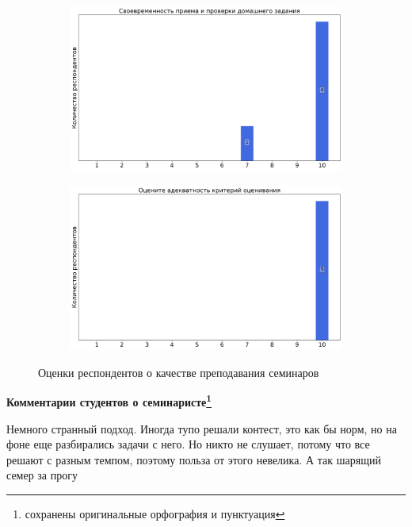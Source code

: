 \begin{figure}[H]
\begin{subfigure}[b]{0.45\textwidth}
                \includegraphics[width=\textwidth]{images/1 course/Информатика/seminarists-marks-Подлесных Д.А.-2.png}
            \end{subfigure}
            \begin{subfigure}[b]{0.45\textwidth}
                \centering
                \includegraphics[width=\textwidth]{images/1 course/Информатика/seminarists-marks-Подлесных Д.А.-3.png}
            \end{subfigure}	
            \caption{Оценки респондентов о качестве преподавания семинаров}
        \end{figure}

        \textbf{Комментарии студентов о семинаристе\protect\footnote{сохранены оригинальные орфография и пунктуация}}
            \begin{commentbox} 
                Немного странный подход. Иногда тупо решали контест, это как бы норм, но на фоне еще разбирались задачи с него. Но никто не слушает, потому что все решают с разным темпом, поэтому польза от этого невелика. А так шарящий семер за прогу 
            \end{commentbox}

